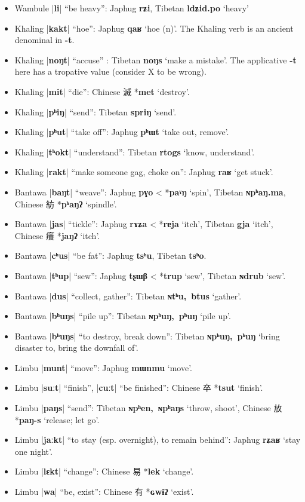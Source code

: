 \documentclass[oldfontcommands,oneside,a4paper,11pt]{article}
\newcommand{\ipa}[1]{\textbf{{\phon\mbox{#1}}}} %
\newcommand{\zh}[1]{{\cn #1}}
\newcommand{\dhatu}[2]{|\ipa{#1}| ``#2''}
\begin{document}
\begin{itemize}
\item Wambule \dhatu{li}{be heavy}: Japhug \ipa{rʑi}, Tibetan \ipa{ldʑid.po} `heavy'
\item Khaling \dhatu{kakt}{hoe}: Japhug \ipa{qaʁ} `hoe (n)'. The Khaling verb is an ancient denominal in \ipa{-t}.
\item Khaling \dhatu{noŋt}{accuse} : Tibetan \ipa{noŋs} `make a mistake'. The applicative \ipa{-t} here has a tropative value (consider X to be wrong).
\item Khaling \dhatu{mit}{die}: Chinese \zh{滅} *\ipa{met} `destroy'.
\item Khaling \dhatu{pʰiŋ}{send}: Tibetan \ipa{spriŋ} `send'.
\item Khaling \dhatu{pʰut}{take off}: Japhug \ipa{pʰɯt} `take out, remove'.
\item Khaling \dhatu{tʰokt}{understand}: Tibetan \ipa{rtogs} `know, understand'.
\item Khaling \dhatu{rakt}{make someone gag, choke on}: Japhug \ipa{raʁ} `get stuck'.
\item Bantawa \dhatu{baŋt}{weave}: Japhug \ipa{pɣo} < *\ipa{paˠŋ} `spin', Tibetan \ipa{ɴpʰaŋ.ma}, Chinese \zh{紡} *\ipa{pʰaŋʔ} `spindle'.
\item Bantawa \dhatu{jas}{tickle}: Japhug \ipa{rɤʑa} < *\ipa{rɐja} `itch', Tibetan \ipa{gja} `itch', Chinese \zh{癢} *\ipa{jaŋʔ} `itch'.
\item Bantawa \dhatu{cʰus}{be fat}: Japhug \ipa{tsʰu}, Tibetan \ipa{tsʰo}.
\item Bantawa \dhatu{tʰup}{sew}: Japhug \ipa{tʂɯβ} < *\ipa{trup} `sew', Tibetan \ipa{ɴdrub} `sew'.
\item Bantawa \dhatu{dus}{collect, gather}: Tibetan \ipa{ɴtʰu, btus} `gather'.
\item Bantawa \dhatu{bʰuŋs}{pile up}: Tibetan \ipa{ɴpʰuŋ, pʰuŋ} `pile up'.
\item Bantawa \dhatu{bʰuŋs}{to destroy, break down}: Tibetan \ipa{ɴpʰuŋ, pʰuŋ} `bring disaster to, bring the downfall of'.
\item Limbu \dhatu{munt}{move}: Japhug \ipa{mɯnmu} `move'.
\item Limbu \dhatu{suːt}{finish}, \dhatu{cuːt}{be finished}: Chinese \zh{卒} *\ipa{tsut} `finish'.
\item Limbu \dhatu{paŋs}{send}: Tibetan \ipa{ɴpʰen, ɴpʰaŋs} `throw, shoot', Chinese \zh{放} *\ipa{paŋ-s} `release; let go'.
\item Limbu \dhatu{jaːkt}{to stay (esp. overnight), to remain behind}: Japhug \ipa{rʑaʁ} `stay one night'.
\item Limbu \dhatu{lɛkt}{change}: Chinese \zh{易} *\ipa{lek} `change'.
\item Limbu \dhatu{wa}{be, exist}: Chinese \zh{有} *\ipa{ɢwɨʔ} `exist'.
\end{itemize}
 


\end{document}
